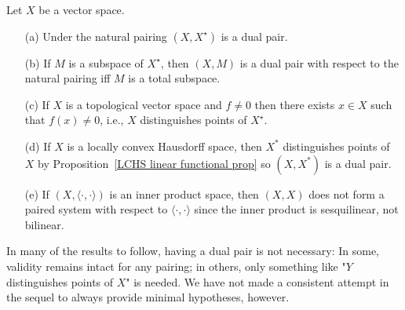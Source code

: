 \begin{example}
Let $X$ be a vector space.
\begin{itemize}
\item[(a)] Under the natural pairing $(X,X^{\star})$ is a dual pair.
\item[(b)] If $M$ is a subspace of $X^{\star}$, then $(X,M)$ is a dual pair with respect to the natural pairing iff $M$ is a total subspace.
\item[(c)] If $X$ is a topological vector space and $f\neq 0$ then there exists $x\in X$ such that $f(x)\neq 0$, i.e., $X$ distinguishes points of $X^{\star}$.
\item[(d)] If $X$ is a locally convex Hausdorff space, then $X^*$ distinguishes points of $X$ by Proposition~\ref{LCHS linear functional prop} so $(X,X^*)$ is a dual pair.
\item[(e)] If $(X,\langle\cdot,\cdot\rangle)$ is an inner product space, then $(X,X)$ does not form a paired system with respect to $\langle\cdot,\cdot\rangle$ since the inner product is sesquilinear, not bilinear. 
\end{itemize}
\end{example}
In many of the results to follow, having a dual pair is not necessary: In some, validity remains intact for any pairing; in others, only something like "$Y$ distinguishes points of $X$" is needed. We have not made a consistent attempt in the sequel to always provide minimal hypotheses, however.
